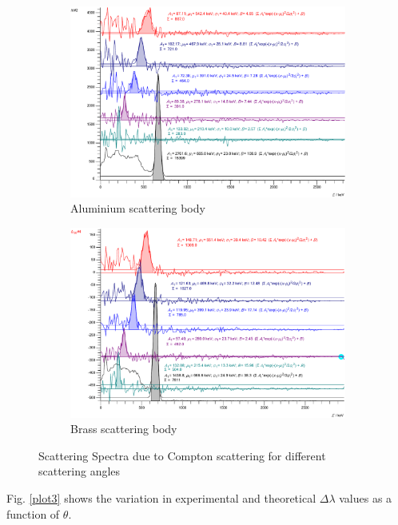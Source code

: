 \begin{figure}
    \begin{subfigure}{\linewidth}
        \centering
        \includegraphics[width=0.9\columnwidth]{images/al_counts.pdf}
        \caption{Aluminium scattering body}
    \end{subfigure}
    \begin{subfigure}{\linewidth}
        \centering
        \includegraphics[width=0.9\columnwidth]{images/cu_counts.pdf}
        \caption{Brass scattering body}
    \end{subfigure}
    \caption{Scattering Spectra due to Compton scattering for different scattering angles}
    \label{plot1}
\end{figure}




Fig. \ref{plot3} shows the variation in experimental and theoretical $\Delta \lambda$ values as a function of $\theta$.

